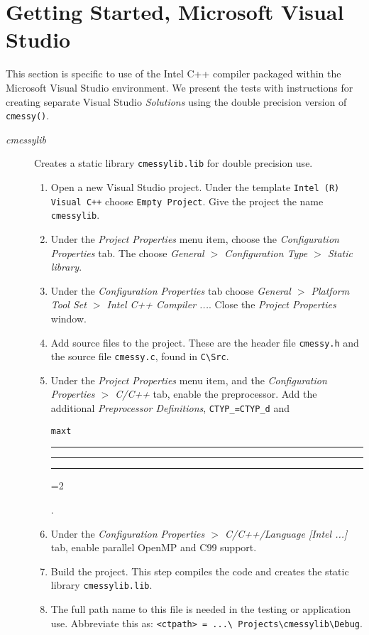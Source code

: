 \documentclass[12pt]{article}
\DeclareRobustCommand{\us}{\rule{.2pt}{0pt}\rule[-.8pt]{.4em}{.5pt}%
\rule{.2pt}{0pt}}
\DeclareRobustCommand{\us}{\rule{.2pt}{0pt}\rule[-.8pt]{.4em}{.5pt}%
\rule{.2pt}{0pt}}
\begin{document}
\section{Getting Started, Microsoft Visual Studio}
This section is specific to use of the Intel C++ compiler packaged within the
Microsoft Visual Studio environment. We present the tests with instructions for
creating separate Visual Studio {\em Solutions} using the double precision
version of {\tt cmessy()}.

\begin{description}
\item[{\em cmessylib}] Creates a static library {\tt cmessylib.lib} for double
  precision use.
  \begin{enumerate}
  \item Open a new Visual Studio project.  Under the template {\tt Intel (R)
      Visual C++} choose {\tt Empty Project}.  Give the project the name {\tt
      cmessylib}.
  \item Under the {\em Project Properties} menu item, choose the {\em
      Configuration Properties} tab.  The choose {\em General $>$ Configuration
      Type $>$ Static library}.
  \item Under the {\em Configuration Properties} tab choose {\em General $>$
Platform Tool Set $>$ Intel C++ Compiler ...}.  Close the {\em Project
Properties} window.
\item Add source files to the project.  These are the header file {\tt cmessy.h}
  and the source file {\tt cmessy.c}, found in {\tt C\textbackslash Src}.
\item Under the {\em Project Properties} menu item, and the {\em Configuration
    Properties $>$ C/C++} tab, enable the preprocessor.  Add the additional {\em
    Preprocessor Definitions}, {\tt CTYP\_=CTYP\_d} and {\tt maxt\us=2}.
\item Under the {\em Configuration Properties $>$ C/C++/Language [Intel ...]}
  tab, enable parallel OpenMP and C99 support.
\item Build the project.  This step compiles the code and creates the static
  library {\tt cmessylib.lib}.
\item The full path name to this file is needed in the testing or application
  use.  Abbreviate this as: {\tt <ctpath> = ...\textbackslash
    Projects\textbackslash cmessylib\textbackslash Debug}.
\end {enumerate}


\end{description}
\end{document}
